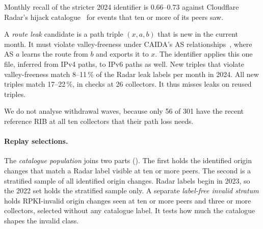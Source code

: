 Monthly recall of the stricter 2024 identifier is 0.66--0.73 against Cloudflare Radar's hijack catalogue~\cite{cloudflare2023hijack,cloudflare_radar_bgp} for events that ten or more of its peers saw.

A \emph{route leak} candidate is a path triple $(x, a, b)$ that is new in the current month.
It must violate valley-freeness under CAIDA's AS relationships~\cite{luckie2013relationships,caida_asrel}, where AS $a$ learns the route from $b$ and exports it to $x$.
The identifier applies this one file, inferred from IPv4 paths, to IPv6 paths as well.
New triples that violate valley-freeness match 8--11\,\% of the Radar leak labels per month in 2024.
All new triples match 17--22\,\%, in checks at 26 collectors.
It thus misses leaks on reused triples.

We do not analyse withdrawal waves, because only 56 of 301 have the recent reference RIB at all ten collectors that their path loss needs.

\paragraph{Replay selections.}
The \emph{catalogue population} joins two parts ().
The first holds the identified origin changes that match a Radar label visible at ten or more peers.
The second is a stratified sample of all identified origin changes.
Radar labels begin in 2023, so the 2022 set holds the stratified sample only.
A separate \emph{label-free invalid stratum} holds RPKI-invalid origin changes seen at ten or more peers and three or more collectors, selected without any catalogue label.
It tests how much the catalogue shapes the invalid class.

